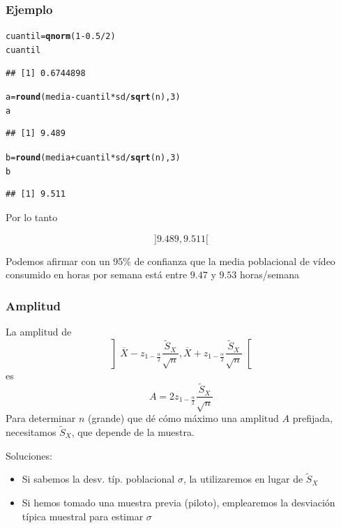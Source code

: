 \documentclass[12pt,t]{beamer}\usepackage[]{graphicx}\usepackage[]{color}
\makeatletter
\newcommand{\hlnum}[1]{\textcolor[rgb]{0.686,0.059,0.569}{#1}}%
\newcommand{\hlopt}[1]{\textcolor[rgb]{0,0,0}{#1}}%
\newcommand{\hlstd}[1]{\textcolor[rgb]{0.345,0.345,0.345}{#1}}%
\newcommand{\hlkwb}[1]{\textcolor[rgb]{0.69,0.353,0.396}{#1}}%
\newcommand{\hlkwd}[1]{\textcolor[rgb]{0.737,0.353,0.396}{\textbf{#1}}}%
\newenvironment{kframe}{%
 \def\at@end@of@kframe{}%
 \ifinner\ifhmode%
  \def\at@end@of@kframe{\end{minipage}}%
  \begin{minipage}{\columnwidth}%
 \fi\fi%
 \def\FrameCommand##1{\hskip\@totalleftmargin \hskip-\fboxsep
 \colorbox{shadecolor}{##1}\hskip-\fboxsep
     \hskip-\linewidth \hskip-\@totalleftmargin \hskip\columnwidth}%
 \MakeFramed {\advance\hsize-\width
   \@totalleftmargin\z@ \linewidth\hsize
   \@setminipage}}%
 {\par\unskip\endMakeFramed%
 \at@end@of@kframe}
\newenvironment{knitrout}{}{} %
\renewcommand{\emph}[1]{{\color{red}#1}}
\theoremstyle{plain}
\theoremstyle{definition}
\makeatother
\begin{document}
\begin{frame}[fragile]
\frametitle{Ejemplo}
\begin{knitrout}
\color{fgcolor}\begin{kframe}
\begin{alltt}
\hlstd{cuantil}\hlkwb{=}\hlkwd{qnorm}\hlstd{(}\hlnum{1}\hlopt{-}\hlnum{0.5}\hlopt{/}\hlnum{2}\hlstd{)}
\hlstd{cuantil}
\end{alltt}
\begin{verbatim}
## [1] 0.6744898
\end{verbatim}
\begin{alltt}
\hlstd{a}\hlkwb{=}\hlkwd{round}\hlstd{(media}\hlopt{-}\hlstd{cuantil}\hlopt{*}\hlstd{sd}\hlopt{/}\hlkwd{sqrt}\hlstd{(n),}\hlnum{3}\hlstd{)}
\hlstd{a}
\end{alltt}
\begin{verbatim}
## [1] 9.489
\end{verbatim}
\begin{alltt}
\hlstd{b}\hlkwb{=}\hlkwd{round}\hlstd{(media}\hlopt{+}\hlstd{cuantil}\hlopt{*}\hlstd{sd}\hlopt{/}\hlkwd{sqrt}\hlstd{(n),}\hlnum{3}\hlstd{)}
\hlstd{b}
\end{alltt}
\begin{verbatim}
## [1] 9.511
\end{verbatim}
\end{kframe}
\end{knitrout}



Por lo tanto 

$$
]9.489,9.511[
$$

Podemos afirmar con un 95\% de confianza  que la media poblacional de  vídeo consumido en horas por semana está entre $9.47$  y  $9.53$ horas/semana


\end{frame}



\begin{frame}
\frametitle{Amplitud}
\vspace*{-2ex}

La amplitud de 
$$
\left]\overline{X}-z_{1-\frac{\alpha}{2}}\frac{\widetilde{S}_X}{\sqrt{n}},
    \overline{X}+z_{1-\frac{\alpha}{2}}\frac{\widetilde{S}_X}{\sqrt{n}}\right[
$$
es
$$
A=2z_{1-\frac{\alpha}{2}}\frac{\widetilde{S}_X}{\sqrt{n}}
$$
Para determinar $n$ (grande) que dé cómo  máximo una amplitud $A$ prefijada, necesitamos $\widetilde{S}_X$, que depende de la muestra.
\medskip

 Soluciones:
\begin{itemize}
\item Si sabemos  la desv. típ. poblacional $\sigma$, la utilizaremos en lugar de  $\widetilde{S}_X$
\item Si hemos tomado una muestra previa (\emph{piloto}), emplearemos  la desviación típica muestral para estimar $\sigma$
\end{itemize}
\end{frame}
\end{document}
